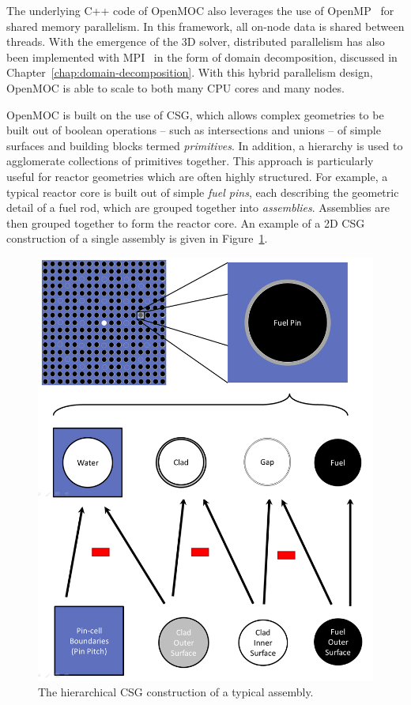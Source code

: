 The underlying C++ code of OpenMOC also leverages the use of OpenMP~\cite{openmp} for shared memory parallelism. In this framework, all on-node data is shared between threads. With the emergence of the 3D solver, distributed parallelism has also been implemented with MPI~\cite{mpi} in the form of domain decomposition, discussed in Chapter~\ref{chap:domain-decomposition}. With this hybrid parallelism design, OpenMOC is able to scale to both many CPU cores and many nodes. 

OpenMOC is built on the use of \ac{CSG}, which allows complex geometries to be built out of boolean operations -- such as intersections and unions -- of simple surfaces and building blocks termed \textit{primitives}. In addition, a hierarchy is used to agglomerate collections of primitives together. This approach is particularly useful for reactor geometries which are often highly structured. For example, a typical reactor core is built out of simple \textit{fuel pins}, each describing the geometric detail of a fuel rod, which are grouped together into \textit{assemblies}. Assemblies are then grouped together to form the reactor core. An example of a 2D \ac{CSG} construction of a single assembly is given in Figure~\ref{fig:core-csg}.

\begin{figure}[h!]
	\centering
	\includegraphics[width=0.9\linewidth]{figures/assembly-csg-new.PNG}
	\caption[]{The hierarchical CSG construction of a typical assembly.}
	\label{fig:core-csg}
\end{figure}

